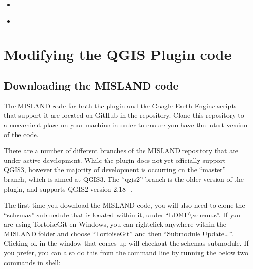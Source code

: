 \documentclass[letterpaper,10pt,english]{sphinxmanual}
\begin{document}
\begin{sphinxShadowBox}
\begin{itemize}
\begin{itemize}
\begin{itemize}
\begin{itemize}
\end{itemize}

\item {} 
\sphinxAtStartPar
{}\label{\detokenize{Qgis_Plugin/plugin_development:id21}}{\hyperref[\detokenize{Qgis_Plugin/plugin_development:testing-an-earth-engine-script-locally}]{}}

\item {} 
\sphinxAtStartPar
{}\label{\detokenize{Qgis_Plugin/plugin_development:id22}}{\hyperref[\detokenize{Qgis_Plugin/plugin_development:deploying-a-gee-script-to-api-trends-earth}]{}}

\end{itemize}

\end{itemize}

\end{itemize}
\end{sphinxShadowBox}


\section{Modifying the QGIS Plugin code}
\label{\detokenize{Qgis_Plugin/plugin_development:modifying-the-qgis-plugin-code}}

\subsection{Downloading the MISLAND code}
\label{\detokenize{Qgis_Plugin/plugin_development:downloading-the-misland-code}}
\sphinxAtStartPar
The MISLAND code for both the plugin and the Google Earth Engine scripts
that support it are located on GitHub in the  repository. Clone
this repository to a convenient place on your machine in order to ensure you
have the latest version of the code.

\sphinxAtStartPar
There are a number of different branches of the MISLAND repository that
are under active development. While the plugin does not yet officially support
QGIS3, however the majority of development is occurring on the “master” branch,
which is aimed at QGIS3. The “qgis2” branch is the older version of the plugin,
and supports QGIS2 version 2.18+.

\sphinxAtStartPar
The first time you download the MISLAND code, you will also need to clone
the “schemas” submodule that is located within it, under “LDMP\textbackslash{}schemas”. If
you are using TortoiseGit on Windows, you can right\sphinxhyphen{}click anywhere within the
MISLAND folder and choose “TortoiseGit” and then “Submodule Update…”.
Clicking ok in the window that comes up will checkout the schemas submodule. If
you prefer, you can also do this from the command line by running the below two
commands in shell:
\end{document}
